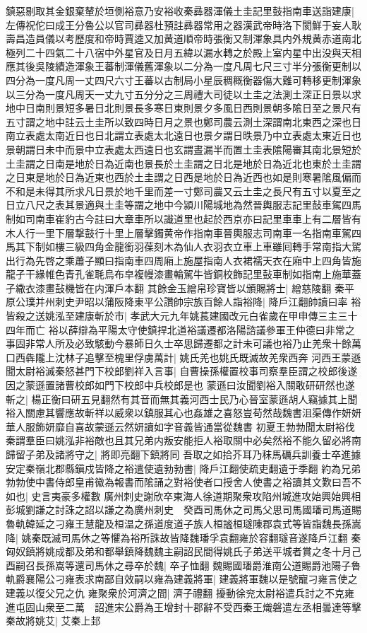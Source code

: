 鎮惡剔取其金銀棄輦於垣側裕意乃安裕收秦彞器渾儀土圭記里鼓指南車送詣建康|{
	左傳祝佗曰成王分魯公以官司彞器杜預註彞器常用之器漢武帝時洛下閡鮮于妄人耿壽昌造員儀以考歷度和帝時賈逵又加黄道順帝時張衡又制渾象具内外規黄赤道南北極列二十四氣二十八宿中外星官及日月五緯以漏水轉之於殿上室内星中出没與天相應其後吳陵績造渾象王蕃制渾儀舊渾象以二分為一度凡周七尺三寸半分張衡更制以四分為一度凡周一丈四尺六寸王蕃以古制局小星辰稠穊衡器傷大難可轉移更制渾象以三分為一度凡周天一丈九寸五分分之三周禮大司徒以土圭之法測土深正日景以求地中日南則景短多暑日北則景長多寒日東則景夕多風日西則景朝多隂日至之景尺有五寸謂之地中註云土圭所以致四時日月之景也鄭司農云測土深謂南北東西之深也日南立表處太南近日也日北謂立表處太北遠日也景夕謂日昳景乃中立表處太東近日也景朝謂日未中而景中立表處太西遠日也玄謂晝漏半而置土圭表隂陽審其南北景短於土圭謂之日南是地於日為近南也景長於土圭謂之日北是地於日為近北也東於土圭謂之日東是地於日為近東也西於土圭謂之日西是地於日為近西也如是則寒暑隂風偏而不和是未得其所求凡日景於地千里而差一寸鄭司農又云土圭之長尺有五寸以夏至之日立八尺之表其景適與土圭等謂之地中今潁川陽城地為然晉輿服志記里鼔車駕四馬制如司南車崔豹古今註曰大章車所以識道里也起於西京亦曰記里車車上有二層皆有木人行一里下層撃鼓行十里上層擊鐲黄帝作指南車晉輿服志司南車一名指南車駕四馬其下制如樓三級四角金龍銜羽葆刻木為仙人衣羽衣立車上車雖囘轉手常南指大駕出行為先啓之乘蕭子顯曰指南車四周廂上施屋指南人衣裙襦天衣在廂中上四角皆施龍孑干緣帷色青孔雀毦烏布皁複幔漆畫輪駕牛皆銅校飾記里鼔車制如指南上施華蓋孑繖衣漆畫鼔機皆在内渾戶本翻}
其餘金玉繒帛珍寶皆以頒賜將士|{
	繒慈陵翻}
秦平原公璞并州刺史尹昭以蒲阪降東平公讚帥宗族百餘人詣裕降|{
	降戶江翻帥讀曰率}
裕皆殺之送姚泓至建康斬於市|{
	孝武大元九年姚萇建國改元白雀歲在甲申傳三主三十四年而亡}
裕以薛辯為平陽太守使鎮捍北道裕議遷都洛陽諮議參軍王仲德曰非常之事固非常人所及必致駭動今暴師日久士卒思歸遷都之計未可議也裕乃止羌衆十餘萬口西犇隴上沈林子追擊至槐里俘虜萬計|{
	姚氏羌也姚氏既滅故羌衆西奔}
河西王蒙遜聞太尉裕滅秦怒甚門下校郎劉祥入言事|{
	自曹操孫權置校事司察羣臣謂之校郎後遂因之蒙遜置諸曹校郎如門下校郎中兵校郎是也}
蒙遜曰汝聞劉裕入關敢研研然也遂斬之|{
	楊正衡曰研五見翻然有其音而無其義河西士民乃心晉室蒙遜胡人竊據其上聞裕入關慮其響應故斬祥以威衆以鎮服其心也姦雄之喜怒豈苟然哉魏書沮渠傳作妍妍華人服飾妍靡自喜故蒙遜云然妍讀如字音義皆通當從魏書}
初夏王勃勃聞太尉裕伐秦謂羣臣曰姚泓非裕敵也且其兄弟内叛安能拒人裕取關中必矣然裕不能久留必將南歸留子弟及諸將守之|{
	將即亮翻下鎮將同}
吾取之如拾芥耳乃秣馬礪兵訓養士卒進據安定秦嶺北郡縣鎭戍皆降之裕遣使遺勃勃書|{
	降戶江翻使疏吏翻遺于季翻}
約為兄弟勃勃使中書侍郎皇甫徽為報書而隂誦之對裕使者口授舍人使書之裕讀其文歎曰吾不如也|{
	史言夷豪多權數}
廣州刺史謝欣卒東海人徐道期聚衆攻陷州城進攻始興始興相彭城劉謙之討誅之詔以謙之為廣州刺史　癸酉司馬休之司馬父思司馬國璠司馬道賜魯軌韓延之刁雍王慧龍及桓温之孫道度道子族人桓謐桓璲陳郡袁式等皆詣魏長孫嵩降|{
	姚秦既滅司馬休之等懼為裕所誅故皆降魏璠孚袁翻雍於容翻璲音遂降戶江翻}
秦匈奴鎮將姚成都及弟和都舉鎮降魏魏主嗣詔民間得姚氏子弟送平城者賞之冬十月己酉嗣召長孫嵩等還司馬休之尋卒於魏|{
	卒子恤翻}
魏賜國璠爵淮南公道賜爵池陽子魯軌爵襄陽公刁雍表求南鄙自效嗣以雍為建義將軍|{
	建義將軍魏以是號寵刁雍言使之建義以復父兄之仇}
雍聚衆於河濟之間|{
	濟子禮翻}
擾動徐兖太尉裕遣兵討之不克雍進屯固山衆至二萬　詔進宋公爵為王增封十郡辭不受西秦王熾磐遣左丞相曇達等擊秦故將姚艾|{
	艾秦上邽}


